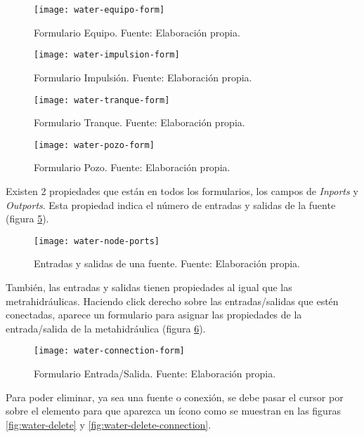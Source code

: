 \begin{figure}[H]
	\centering
	\texttt{[image: water-equipo-form]}
	\caption{\label{fig:water-Equipo-form} Formulario Equipo. Fuente: Elaboración propia.}
\end{figure}

\begin{figure}[H]
	\centering
	\texttt{[image: water-impulsion-form]}
	\caption{\label{fig:water-impulsion-form} Formulario Impulsión. Fuente: Elaboración propia.}
\end{figure}

\begin{figure}[H]
	\centering
	\texttt{[image: water-tranque-form]}
	\caption{\label{fig:water-tranque-form} Formulario Tranque. Fuente: Elaboración propia.}
\end{figure}

\begin{figure}[H]
	\centering
	\texttt{[image: water-pozo-form]}
	\caption{\label{fig:water-pozo-form} Formulario Pozo. Fuente: Elaboración propia.}
\end{figure}

Existen 2 propiedades que están en todos los formularios, los campos de \textit{Inports} y \textit{Outports}. Esta propiedad indica el número de entradas y salidas de la fuente (figura \ref{fig:water-node-ports}).

\begin{figure}[H]
	\centering
	\texttt{[image: water-node-ports]}
	\caption{\label{fig:water-node-ports} Entradas y salidas de una fuente. Fuente: Elaboración propia.}
\end{figure}

También, las entradas y salidas tienen propiedades al igual que las metrahidráulicas. Haciendo click derecho sobre las entradas/salidas que estén conectadas, aparece un formulario para asignar las propiedades de la entrada/salida de la metahidráulica (figura \ref{fig:water-conexion-form}).

\begin{figure}[H]
	\centering
	\texttt{[image: water-connection-form]}
	\caption{\label{fig:water-conexion-form} Formulario Entrada/Salida. Fuente: Elaboración propia.}
\end{figure}

Para poder eliminar, ya sea una fuente o conexión, se debe pasar el cursor por sobre el elemento para que aparezca un ícono como se muestran en las figuras \ref{fig:water-delete} y \ref{fig:water-delete-connection}.

